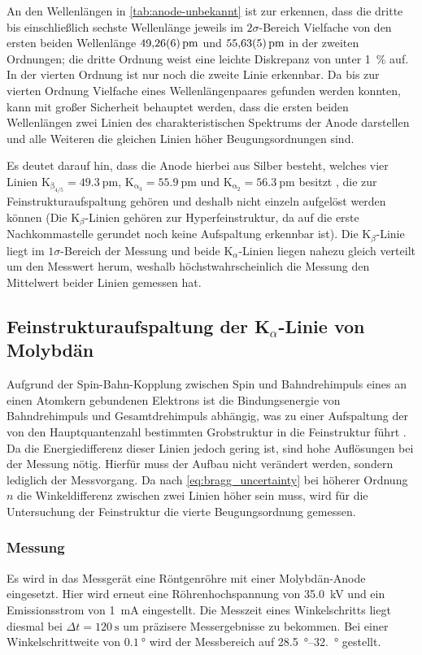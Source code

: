 An den Wellenlängen in \cref{tab:anode-unbekannt} ist zur erkennen, dass die dritte bis einschließlich 
sechste Wellenlänge jeweils im $2\sigma$-Bereich Vielfache von den ersten beiden Wellenlänge $\SI{49.26\pm 0.06}{\pm}$
und $\SI{55.63\pm 0.05}{\pm}$ in der zweiten Ordnungen; die dritte Ordnung weist eine leichte Diskrepanz von 
unter \SI{1}{\percent} auf. In der vierten Ordnung ist nur noch die zweite Linie erkennbar. Da bis zur vierten 
Ordnung Vielfache eines Wellenlängenpaares gefunden werden konnten, kann mit großer Sicherheit 
behauptet werden, dass die ersten beiden Wellenlängen zwei Linien des charakteristischen Spektrums 
der Anode darstellen und alle Weiteren die gleichen Linien höher Beugungsordnungen sind.\par
Es deutet darauf hin, dass die Anode hierbei aus Silber besteht, welches 
vier Linien K$_\mathrm{\beta_{4/5}} = \SI{49.3}{\pm}$,  K$_\mathrm{\alpha_3}=\SI{55.9}{\pm}$
und K$_\mathrm{\alpha_2}=\SI{56.3}{\pm}$ besitzt \cite{nist_xray_database}, die zur Feinstrukturaufspaltung gehören und 
deshalb nicht einzeln aufgelöst werden können (Die K$_\beta$-Linien gehören zur 
Hyperfeinstruktur, da auf die erste Nachkommastelle gerundet noch keine 
Aufspaltung erkennbar ist). Die K$_\beta$-Linie liegt im $1\sigma$-Bereich 
der Messung und beide K$_\alpha$-Linien liegen nahezu gleich verteilt um den Messwert herum, weshalb 
höchstwahrscheinlich die Messung den Mittelwert beider Linien gemessen hat.

\subsection{Feinstrukturaufspaltung der K$_\alpha$-Linie von Molybdän}
Aufgrund der Spin-Bahn-Kopplung zwischen Spin und Bahndrehimpuls eines an einen Atomkern 
gebundenen Elektrons ist die Bindungsenergie von Bahndrehimpuls und Gesamtdrehimpuls abhängig, was 
zu einer Aufspaltung der von den Hauptquantenzahl bestimmten Grobstruktur in die Feinstruktur führt
\cite{Demtröder:829119}. Da die Energiedifferenz dieser Linien jedoch gering ist, sind hohe 
Auflösungen bei der Messung nötig. Hierfür muss der Aufbau nicht verändert werden, sondern lediglich 
der Messvorgang. Da nach \cref{eq:bragg_uncertainty} bei höherer Ordnung $n$ die Winkeldifferenz zwischen 
zwei Linien höher sein muss, wird für die Untersuchung der Feinstruktur die vierte Beugungsordnung gemessen.

\subsubsection{Messung}
Es wird in das Messgerät eine Röntgenröhre mit einer Molybdän-Anode eingesetzt. Hier wird 
erneut eine Röhrenhochspannung von \SI{35.0}{\kilo\volt} und
ein Emissionsstrom von \SI{1}{\milli\ampere} eingestellt. Die Messzeit eines Winkelschritts liegt diesmal
bei $\Delta t = \SI{120}{\second}$ um präzisere Messergebnisse zu bekommen.
Bei einer Winkelschrittweite von $\SI{0.1}{\degree}$ wird der Messbereich auf \qtyrange{28.5}{32.}{\degree} gestellt.

